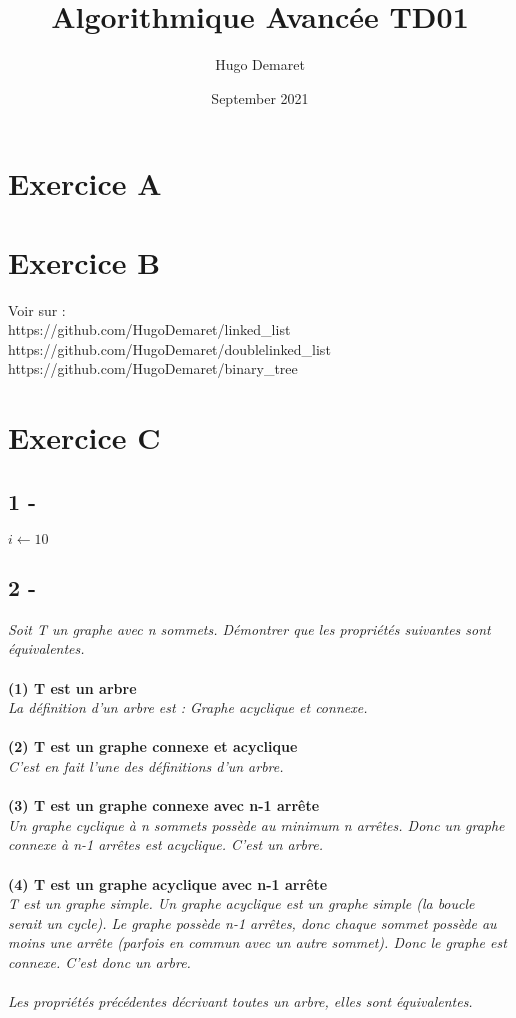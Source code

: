 \documentclass{article}
\title{Algorithmique Avancée TD01}
\author{Hugo Demaret}
\date{September 2021}
\begin{document}
\maketitle
\section*{Exercice A}
\section*{Exercice B}
Voir sur :\\
https://github.com/HugoDemaret/linked\_list\\
https://github.com/HugoDemaret/doublelinked\_list\\
https://github.com/HugoDemaret/binary\_tree\\

\section*{Exercice C}
\subsection*{1 -}
\begin{algorithmic}
\State $i \gets 10$
\end{algorithmic}
\subsection*{2 -}
\textit{Soit T un graphe avec n sommets. Démontrer que les propriétés suivantes sont équivalentes.}\\\\
\textbf{(1) T est un arbre}\\
\textit{La définition d'un arbre est : Graphe acyclique et connexe.}\\\\
\textbf{(2) T est un graphe connexe et acyclique}\\
\textit{C'est en fait l'une des définitions d'un arbre.}\\\\
\textbf{(3) T est un graphe connexe avec n-1 arrête}\\
\textit{Un graphe cyclique à n sommets possède au minimum n arrêtes. Donc un graphe connexe à n-1 arrêtes est acyclique. C'est un arbre.}\\\\
\textbf{(4) T est un graphe acyclique avec n-1 arrête}\\
\textit{T est un graphe simple. Un graphe acyclique est un graphe simple (la boucle serait un cycle). Le graphe possède n-1 arrêtes, donc chaque sommet possède au moins une arrête (parfois en commun avec un autre sommet). Donc le graphe est connexe. C'est donc un arbre.}\\\\
\textit{Les propriétés précédentes décrivant toutes un arbre, elles sont équivalentes.}\\\\
\end{document}
